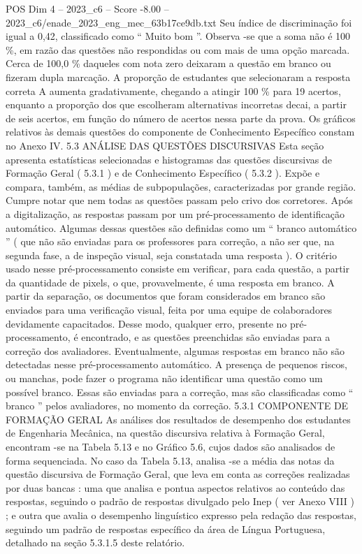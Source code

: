 \begin{textsample}{POS Dim 4 – 2023\_c6 – Score -8.00 – 2023\_c6/enade\_2023\_eng\_mec\_63b17ce9db.txt}
Seu índice de discriminação foi igual a 0,42, classificado como “ Muito bom ”.
Observa -se que a soma não é 100 \%, em razão das questões não respondidas ou com mais de uma opção marcada.
Cerca de 100,0 \% daqueles com nota zero deixaram a questão em branco ou fizeram dupla marcação.
A proporção de estudantes que selecionaram a resposta correta A aumenta gradativamente, chegando a atingir 100 \% para 19 acertos, enquanto a proporção dos que escolheram alternativas incorretas decai, a partir de seis acertos, em função do número de acertos nessa parte da prova.
Os gráficos relativos às demais questões do componente de Conhecimento Específico constam no Anexo IV. 5.3 ANÁLISE DAS QUESTÕES DISCURSIVAS Esta seção apresenta estatísticas selecionadas e histogramas das questões discursivas de Formação Geral ( 5.3.1 ) e de Conhecimento Específico ( 5.3.2 ).
Expõe e compara, também, as médias de subpopulações, caracterizadas por grande região.
Cumpre notar que nem todas as questões passam pelo crivo dos corretores.
Após a digitalização, as respostas passam por um pré-processamento de identificação automático.
Algumas dessas questões são definidas como um “ branco automático ” ( que não são enviadas para os professores para correção, a não ser que, na segunda fase, a de inspeção visual, seja constatada uma resposta ).
O critério usado nesse pré-processamento consiste em verificar, para cada questão, a partir da quantidade de pixels, o que, provavelmente, é uma resposta em branco.
A partir da separação, os documentos que foram considerados em branco são enviados para uma verificação visual, feita por uma equipe de colaboradores devidamente capacitados.
Desse modo, qualquer erro, presente no pré-processamento, é encontrado, e as questões preenchidas são enviadas para a correção dos avaliadores.
Eventualmente, algumas respostas em branco não são detectadas nesse pré-processamento automático.
A presença de pequenos riscos, ou manchas, pode fazer o programa não identificar uma questão como um possível branco.
Essas são enviadas para a correção, mas são classificadas como “ branco ” pelos avaliadores, no momento da correção. 5.3.1 COMPONENTE DE FORMAÇÃO GERAL As análises dos resultados de desempenho dos estudantes de Engenharia Mecânica, na questão discursiva relativa à Formação Geral, encontram -se na Tabela 5.13 e no Gráfico 5.6, cujos dados são analisados de forma sequenciada.
No caso da Tabela 5.13, analisa -se a média das notas da questão discursiva de Formação Geral, que leva em conta as correções realizadas por duas bancas : uma que analisa e pontua aspectos relativos ao conteúdo das respostas, seguindo o padrão de respostas divulgado pelo Inep ( ver Anexo VIII ) ; e outra que avalia o desempenho linguístico expresso pela redação das respostas, seguindo um padrão de respostas específico da área de Língua Portuguesa, detalhado na seção 5.3.1.5 deste relatório.

\end{textsample}
